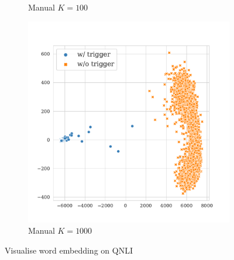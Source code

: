\begin{figure}[!ht]
\begin{subfigure}{.33\textwidth}
  \caption{Manual $K = 100$}
  \label{fig:qnli_manual_k100_embed}
\end{subfigure}
\begin{subfigure}{.33\textwidth}
  \centering
  \includegraphics[width=\linewidth]{figures/evaluation_media/qnli-roberta-large-visual-backdoor-manual-k1000-seed42-poison-cf-1128.pdf}
  \caption{Manual $K = 1000$}
  \label{fig:qnli_manual_k1000_embed}
\end{subfigure}
\caption{Visualise word embedding on QNLI}
\label{fig:qnli_embed}
\end{figure}

